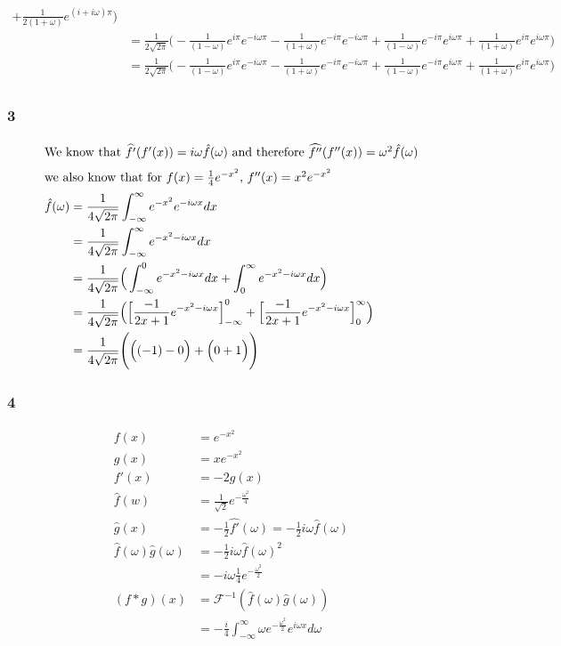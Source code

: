 \documentclass[a4paper]{article}
\newcommand{\ex}[1]{\subsubsection*{#1}}
\begin{document}
\begin{enumerate}[label=\alph*)]
{\begin{align}
                + \frac{1}{2(1+\omega )} e^{(i+i\omega )\pi} \Bigg) \\
            &= \frac{1}{2\sqrt{2\pi}} \Bigg( 
                - \frac{1}{(1-\omega )} e^{i\pi}e^{-i\omega \pi} 
                - \frac{1}{(1+\omega )} e^{-i\pi}e^{-i\omega \pi} 
                + \frac{1}{(1-\omega )} e^{-i\pi}e^{i\omega \pi} 
                + \frac{1}{(1+\omega )} e^{i\pi}e^{i\omega \pi} \Bigg) \\
            &= \frac{1}{2\sqrt{2\pi}} \Bigg( 
                - \frac{1}{(1-\omega )} e^{i\pi}e^{-i\omega \pi} 
                - \frac{1}{(1+\omega )} e^{-i\pi}e^{-i\omega \pi} 
                + \frac{1}{(1-\omega )} e^{-i\pi}e^{i\omega \pi} 
                + \frac{1}{(1+\omega )} e^{i\pi}e^{i\omega \pi} \Bigg) \\
        \end{align}
    }
\end{enumerate}

\ex{3}

\begin{align}
    \intertext{We know  that \( \widehat{f'}(f'(x)) = i\omega \hat f(\omega )\) and therefore 
        \(\widehat{f''}(f''(x)) = \omega ^2 \hat f(\omega )\)}
    \intertext{we also know that for \(f(x) = \frac{1}{4}e^{-x^2}\), \(f''(x) = x^2e^{-x^2}\)}
    \hat f(\omega ) &= \frac{1}{4\sqrt{2\pi}}\int_{-\infty}^{\infty}{e^{-x^2} e^{-i\omega x} dx} \\
    &= \frac{1}{4\sqrt{2\pi}}\int_{-\infty}^{\infty}{e^{-x^2-i\omega x} dx} \\
    &= \frac{1}{4\sqrt{2\pi}}\Big(\int_{-\infty}^{0}{e^{-x^2-i\omega x} dx}
        + \int_{0}^{\infty}{e^{-x^2-i\omega x} dx}\Big) \\
    &= \frac{1}{4\sqrt{2\pi}}\Big(\Big[{\frac{-1}{2x+1}e^{-x^2-i\omega x}\Big]_{-\infty}^{0}} 
        + \Big[{\frac{-1}{2x+1}e^{-x^2-i\omega x}\Big]_{0}^{\infty}}\Big) \\
    &= \frac{1}{4\sqrt{2\pi}}\Bigg(\Big( (-1) - 0\Big) + \Big(0 + 1 \Big)\Bigg) \\
\end{align}


\ex{4}

\begin{align}
    f(x) &= e^{-x^2} \\
    g(x) &= xe^{-x^2} \\
    f'(x) &= -2g(x) \\
    \hat f(w) &= \frac{1}{\sqrt{2}} e^{-\frac{\omega^2}{4}} \\
    \hat g(x) &= -\frac{1}{2} \widehat{f'}(\omega) = -\frac{1}{2}i\omega \hat f(\omega) \\
    \hat f(\omega) \hat g(\omega) &= -\frac{1}{2}i\omega \hat f(\omega)^2 \\
    &= -i\omega\frac{1}{4}e^{-\frac{\omega^2}{2}} \\
    (f*g)(x) &= \mathcal{F}^{-1} ( \hat f(\omega) \hat g(\omega) ) \\
    &= -\frac{i}{4} \int_{-\infty}^{\infty}{\omega e^{-\frac{\omega^2}{2}}
        e^{i\omega x} d\omega}
\end{align}
\end{document}
